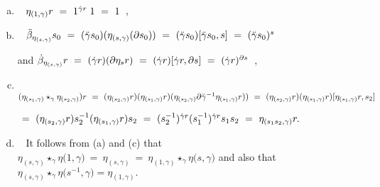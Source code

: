 \begin{pf}
\begin{enumerate}[(a)]
\item~
$\eta_{(1,\gamma)} r ~=~ 1^{\dot{\gamma} r}\; 1 ~=~ 1$~,
\item~
$\ddot{\beta}_{\eta_{(s,\gamma)}} s_0 ~=~ (\ddot{\gamma} s_0)(\eta_{(s,\gamma)}(\partial s_0))
~=~ (\ddot{\gamma} s_0) [\ddot{\gamma} s_0,s] ~=~ (\ddot{\gamma} s_0)^s$  

and \quad 
$\dot{\beta}_{\eta_{(s,\gamma)}}r ~=~ (\dot{\gamma} r)(\partial \eta_s r)
~=~ (\dot{\gamma} r) [\dot{\gamma} r, \partial s] 
~=~ (\dot{\gamma} r)^{\partial s}$~,
\item~
$(\eta_{(s_1,\gamma)} \star_{\gamma} \eta_{(s_2,\gamma)})r 
~=~ (\eta_{(s_2,\gamma)}r)(\eta_{(s_1,\gamma)}r)
       (\eta_{(s_2,\gamma)}\partial\ddot{\gamma}^{-1}\eta_{(s_1,\gamma)}r)) 
~=~ (\eta_{(s_2,\gamma)}r)(\eta_{(s_1,\gamma)}r)[\eta_{(s_1,\gamma)}r,s_2] $ 

$~=~ (\eta_{(s_2,\gamma)}r)s_2^{-1}(\eta_{(s_1,\gamma)}r)s_2 
~=~ (s_2^{-1})^{\dot{\gamma} r}(s_1^{-1})^{\dot{\gamma} r}s_1s_2 
~=~ \eta_{(s_1s_2,\gamma)}r.$ 
\item~
It follows from (a) and (c) that 
$\eta_{(s,\gamma)} \star_{\gamma} \eta({1,\gamma)} ~=~ \eta_{(s,\gamma)} 
 ~=~ \eta_{(1,\gamma)} \star_{\gamma} \eta({s,\gamma)}$ 
 and also that $\eta_{(s,\gamma)} \star_{\gamma} \eta({s^{-1},\gamma)} = \eta_{(1,\gamma)}.$ 
\end{enumerate}
\end{pf}

